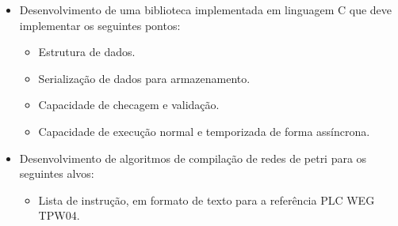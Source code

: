 \begin{itemize}
	\item Desenvolvimento de uma biblioteca implementada em linguagem C que deve implementar os seguintes pontos: 
	\begin{itemize}
		\item Estrutura de dados.
		\item Serialização de dados para armazenamento.
		\item Capacidade de checagem e validação.
		\item Capacidade de execução normal e temporizada de forma assíncrona.
	\end{itemize}
	
	\item Desenvolvimento de algoritmos de compilação de redes de petri para os seguintes alvos:
	\begin{itemize}
		\item Lista de instrução, em formato de texto para a referência PLC WEG TPW04.
	\end{itemize}


\end{itemize}